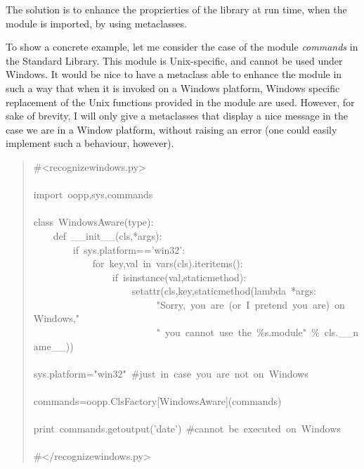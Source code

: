 \documentclass[10pt,english]{article}
\begin{document}
The solution is to enhance the proprierties of the library at run
time, when the module is imported, by using metaclasses.

To show a concrete example, let me consider the case of the module
\emph{commands} in the Standard Library. This module is Unix-specific,
and cannot be used under Windows. It would be nice to have a
metaclass able to enhance the module in such a way that
when it is invoked on a Windows platform, Windows specific replacement
of the Unix functions provided in the module are used. However,
for sake of brevity, I will only give a metaclasses that display
a nice message in the case we are in a Window platform, without
raising an error (one could easily implement such a behaviour,
however).
\begin{quote}
\begin{ttfamily}\begin{flushleft}
\mbox{{\#}<recognizewindows.py>}\\
\mbox{}\\
\mbox{import~oopp,sys,commands}\\
\mbox{}\\
\mbox{class~WindowsAware(type):}\\
\mbox{~~~~def~{\_}{\_}init{\_}{\_}(cls,*args):~}\\
\mbox{~~~~~~~~if~sys.platform=='win32':~}\\
\mbox{~~~~~~~~~~~~for~key,val~in~vars(cls).iteritems():}\\
\mbox{~~~~~~~~~~~~~~~~if~isinstance(val,staticmethod):}\\
\mbox{~~~~~~~~~~~~~~~~~~~~setattr(cls,key,staticmethod(lambda~*args:~}\\
\mbox{~~~~~~~~~~~~~~~~~~~~~~~~~"Sorry,~you~are~(or~I~pretend~you~are)~on~Windows,"}\\
\mbox{~~~~~~~~~~~~~~~~~~~~~~~~~"~you~cannot~use~the~{\%}s.module"~{\%}~cls.{\_}{\_}name{\_}{\_}))}\\
\mbox{~~~~~~~~~~}\\
\mbox{sys.platform="win32"~{\#}just~in~case~you~are~not~on~Windows}\\
\mbox{}\\
\mbox{commands=oopp.ClsFactory[WindowsAware](commands)}\\
\mbox{}\\
\mbox{print~commands.getoutput('date')~{\#}cannot~be~executed~on~Windows}\\
\mbox{}\\
\mbox{{\#}</recognizewindows.py>}
\end{flushleft}\end{ttfamily}
\end{quote}
\end{document}
